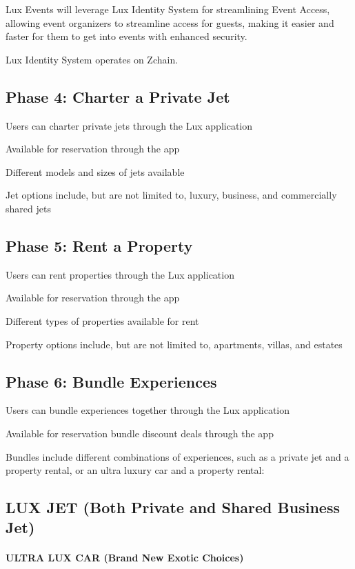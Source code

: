 \documentclass[11pt]{article}
\begin{document}
Lux Events will leverage Lux Identity System for streamlining Event Access, allowing event organizers to streamline access for guests, making it easier and faster for them to get into events with enhanced security.


Lux Identity System operates on Zchain.


\subsection{Phase 4: Charter a Private Jet}

Users can charter private jets through the Lux application


Available for reservation through the app


Different models and sizes of jets available


Jet options include, but are not limited to, luxury, business, and commercially shared jets


\subsection{Phase 5: Rent a Property}

Users can rent properties through the Lux application


Available for reservation through the app


Different types of properties available for rent


Property options include, but are not limited to, apartments, villas, and estates


\subsection{Phase 6: Bundle Experiences}

Users can bundle experiences together through the Lux application


Available for reservation bundle discount deals through the app


Bundles include different combinations of experiences, such as a private jet and a property rental, or an ultra luxury car and a property rental:


\subsection{LUX JET (Both Private and Shared Business Jet)}

\paragraph{ULTRA LUX CAR  (Brand New Exotic Choices)}
\end{document}
